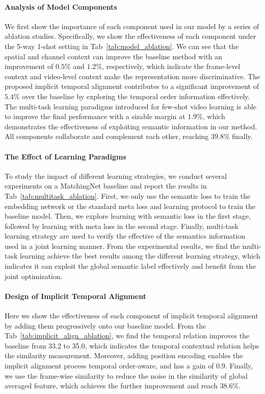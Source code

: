 \documentclass{article}
\begin{document}
\paragraph{Analysis of Model Components}\label{sec:ablation}
We first show the importance of each component used in our model by a series of ablation studies.
Specifically, we show the effectiveness of each component under the 5-way 1-shot setting in Tab~\ref{tab:model_ablation}. We can see that the spatial and channel context can improve the baseline method with an improvement of $\mathbf{0.5\%}$ and $\mathbf{1.2\%}$, respectively, which indicate the frame-level context and video-level context make the representation more discriminative. The proposed implicit temporal alignment contributes to a significant improvement of $\mathbf{5.4\%}$ over the baseline by exploring the temporal order information effectively. The multi-task learning paradigms introduced for few-shot video learning is able to improve the final performance with a sizable margin at $\mathbf{1.9\%}$, which demonstrates the effectiveness of exploiting semantic information in our method. All components collaborate and complement each other, reaching $\mathbf{39.8\%}$ finally.


\paragraph{The Effect of Learning Paradigms} To study the impact of different learning strategies, we conduct several experiments on a MatchingNet baseline and report the results in Tab~\ref{tab:multitask_ablation}.
First, we only use the semantic loss to train the embedding network or the standard meta loss and learning protocol to train the baseline model. 
Then, we explore learning with semantic loss in the first stage, followed by learning with meta loss in the second stage. Finally, multi-task learning strategy are used to verify the effective of the semantics information used in a joint learning manner. From the experimental results, we find the multi-task learning achieve the best results among the different learning strategy, which indicates it can exploit the global semantic label effectively and benefit from the joint optimization.





\paragraph{Design of Implicit Temporal Alignment}\label{sec:ablation}
Here we show the effectiveness of each component of implicit temporal alignment by adding them progressively onto our baseline model. From the Tab~\ref{tab:implicit_align_ablation}, we find the temporal relation improves the baseline from 33.2 to 35.0, which indicates the temporal contextual relation helps the similarity measurement. Moreover, adding position encoding enables the implicit alignment process temporal order-aware, and has a gain of 0.9. Finally, we use the frame-wise similarity to reduce the noise in the similarity of global averaged feature, which achieves the further improvement and reach $\mathbf{38.6\%}$.
\end{document}
